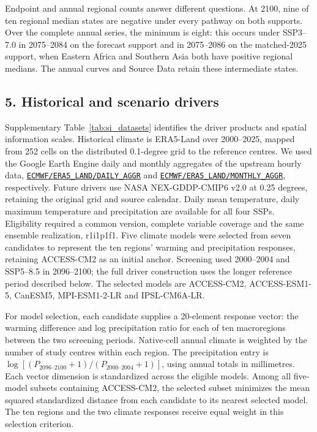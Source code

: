 Endpoint and annual regional counts answer different questions. At 2100, nine of ten regional median states are negative under every pathway on both supports. Over the complete annual series, the minimum is eight: this occurs under SSP3--7.0 in 2075--2084 on the forecast support and in 2075--2086 on the matched-2025 support, when Eastern Africa and Southern Asia both have positive regional medians. The annual curves and Source Data retain these intermediate states.

\subsection{5. Historical and scenario drivers}

Supplementary Table~\ref{tab:si_datasets} identifies the driver products and spatial information scales. Historical climate is ERA5-Land over 2000--2025\cite{ERA5Land2021,ERA5LandHourlyData}, mapped from 252 cells on the distributed 0.1-degree grid to the reference centres. We used the Google Earth Engine daily and monthly aggregates of the upstream hourly data, \href{https://developers.google.com/earth-engine/datasets/catalog/ECMWF_ERA5_LAND_DAILY_AGGR}{\nolinkurl{ECMWF/ERA5_LAND/DAILY_AGGR}} and \href{https://developers.google.com/earth-engine/datasets/catalog/ECMWF_ERA5_LAND_MONTHLY_AGGR}{\nolinkurl{ECMWF/ERA5_LAND/MONTHLY_AGGR}}, respectively. Future drivers use NASA NEX-GDDP-CMIP6 v2.0 at 0.25 degrees\cite{ref054,NEXGDDPCMIP6Data}, retaining the original grid and source calendar. Daily mean temperature, daily maximum temperature and precipitation are available for all four SSPs. Eligibility required a common version, complete variable coverage and the same ensemble realization, r1i1p1f1. Five climate models were selected from seven candidates to represent the ten regions' warming and precipitation responses, retaining ACCESS-CM2 as an initial anchor. Screening used 2000--2004 and SSP5--8.5 in 2096--2100; the full driver construction uses the longer reference period described below. The selected models are ACCESS-CM2, ACCESS-ESM1-5, CanESM5, MPI-ESM1-2-LR and IPSL-CM6A-LR.

For model selection, each candidate supplies a 20-element response vector: the warming difference and log precipitation ratio for each of ten macroregions between the two screening periods. Native-cell annual climate is weighted by the number of study centres within each region. The precipitation entry is $\log[(P_{2096\text{--}2100}+1)/(P_{2000\text{--}2004}+1)]$, using annual totals in millimetres. Each vector dimension is standardized across the eligible models. Among all five-model subsets containing ACCESS-CM2, the selected subset minimizes the mean squared standardized distance from each candidate to its nearest selected model. The ten regions and the two climate responses receive equal weight in this selection criterion.

